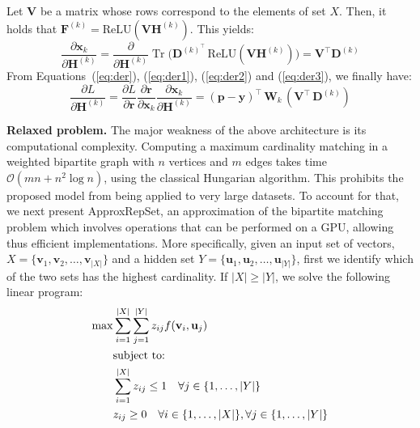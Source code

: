 \documentclass[twoside]{article}
\DeclareMathOperator{\Tr}{Tr}
\begin{document}
Let $\mathbf{V}$ be a matrix whose rows correspond to the elements of set $X$.
Then, it holds that $\mathbf{F}^{(k)}=\text{ReLU}(\mathbf{V}\mathbf{H}^{(k)})$.
This yields:
\begin{equation}
    \frac{\partial \mathbf{x}_k}{\partial \mathbf{H}^{(k)}} = \frac{\partial }{\partial \mathbf{H}^{(k)}} \Tr \big(\mathbf{D}^{(k)^{\top}} \, \text{ReLU}(\mathbf{V}\mathbf{H}^{(k)}) \big) = \mathbf{V}^\top \mathbf{D}^{(k)}
    \label{eq:der3}
\end{equation}
From Equations~(\ref{eq:der}), (\ref{eq:der1}), (\ref{eq:der2}) and (\ref{eq:der3}), we finally have: 
\begin{equation*}
    \frac{\partial L}{\partial \mathbf{H}^{(k)}} = \frac{\partial L}{\partial \mathbf{r}}\frac{\partial \mathbf{r}}{\partial \mathbf{x}_k} \frac{\partial \mathbf{x}_k}{\partial \mathbf{H}^{(k)}} = (\mathbf{p} - \mathbf{y})^\top \, \mathbf{W}_k \, (\mathbf{V}^\top \, \mathbf{D}^{(k)})
\end{equation*}

\noindent\textbf{Relaxed problem.}
The major weakness of the above architecture is its computational complexity.
Computing a maximum cardinality matching in a weighted bipartite graph with $n$ vertices and $m$ edges takes time $\mathcal{O}(mn + n^2 \log n)$, using the classical Hungarian algorithm.
This prohibits the proposed model from being applied to very large datasets.
To account for that, we next present ApproxRepSet, an approximation of the bipartite matching problem which involves operations that can be performed on a GPU, allowing thus efficient implementations.
More specifically, given an input set of vectors, $X = \{ \mathbf{v}_1, \mathbf{v}_2, \ldots, \mathbf{v}_{|X|} \}$ and a hidden set $Y = \{ \mathbf{u}_1, \mathbf{u}_2, \ldots, \mathbf{u}_{|Y|} \}$, first we identify which of the two sets has the highest cardinality.
If $|X| \geq |Y|$, we solve the following linear program:
\begin{equation}
\begin{split}
  \max \displaystyle & \sum_{i=1}^{|X|} \sum_{j=1}^{|Y|} z_{ij} f(\mathbf{v}_i, \mathbf{u}_j) \\
  & \textrm{subject to:} \\
  & \sum_{i=1}^{|X|} z_{ij} \leq 1 \quad \forall j \in \{ 1,\ldots,|Y| \} \\
  & z_{ij} \geq 0 \quad \forall i \in \{ 1,\ldots,|X| \}, \forall j \in \{ 1,\ldots,|Y| \} \\ 
\end{split}
\label{eq:approx_primal}
\end{equation}
\end{document}
